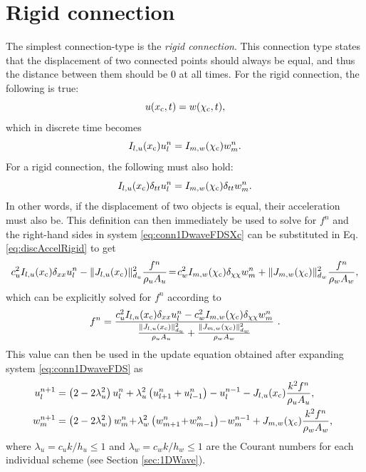 \section{Rigid connection}\label{sec:rigidConn}
The simplest connection-type is the \textit{rigid connection}. This connection type states that the displacement of two connected points should always be equal, and thus the distance between them should be 0 at all times. 
For the rigid connection, the following is true:
\begin{equation}\label{eq:contRigid}
    u(x_{\text{c}}, t) = w(\chi_{\text{c}}, t),
\end{equation}
which in discrete time becomes
\begin{equation}\label{eq:discRigid}
    I_{l, u}(x_{\text{c}})u_l^n = I_{m, w}(\chi_{\text{c}})w_m^n.
\end{equation}
For a rigid connection, the following must also hold:
\begin{equation}\label{eq:discAccelRigid}
    I_{l, u}(x_{\text{c}})\delta_{tt}u_l^n = I_{m, w}(\chi_{\text{c}})\delta_{tt}w_m^n.
\end{equation}
In other words, if the displacement of two objects is equal, their acceleration must also be. This definition can then immediately be used to solve for $f^n$ and the right-hand sides in system \eqref{eq:conn1DwaveFDSXc} can be substituted in Eq. \eqref{eq:discAccelRigid} to get
\begin{equation*}
    c_u^2 I_{l, u}(x_{\text{c}})\delta_{xx} u_l^n -\lVert J_{l, u}(x_{\text{c}})\rVert_{d_u}^2\frac{f^n}{\rho_u A_u}
    \!=\! c_w^2 I_{m, w}(\chi_{\text{c}})\delta_{\chi\chi} w_m^n + \lVert J_{m, w}(\chi_{\text{c}})\rVert_{d_w}^2\frac{f^n}{\rho_w A_w},
\end{equation*}
which can be explicitly solved for $f^n$ according to
\begin{equation}\label{eq:rigidForce}
    f^n = \frac{c_u^2 I_{l, u}(x_{\text{c}})\delta_{xx} u_l^n - c_w^2 I_{m, w}(\chi_{\text{c}})\delta_{\chi\chi} w_m^n}{\frac{\lVert J_{l, u}(x_{\text{c}})\rVert_{d_u}^2}{\rho_u A_u} + \frac{\lVert J_{m, w}(\chi_{\text{c}})\rVert_{d_w}^2}{\rho_w A_w}}\ .
\end{equation}
This value can then be used in the update equation obtained after expanding system \eqref{eq:conn1DwaveFDS} as
\begin{subequations}
    \begin{align}
        \!\!\!u_l^{n+1} &= \left(2-2\lambda_u^2\right) \uln  + \lambda_u^2\left(u_{l+1}^n + u_{l-1}^n\right) - u_l^{n-1} -\Ju\frac{k^2 f^n}{\rho_u A_u},\\
        \!\!\!w_m^{n+1} &= \left(2-2\lambda_w^2\right) \wmn\! +\! \lambda_w^2\left(w_{m+1}^n\! +\! w_{m-1}^n\right) \! -\! w_m^{n-1} +\Jw\frac{k^2 f^n}{\rho_w A_w},
    \end{align}
\end{subequations}
where $\lambda_u = c_uk/h_u \leq 1$ and  $\lambda_w = c_wk/h_w \leq 1$ are the Courant numbers for each individual scheme (see Section \ref{sec:1DWave}).

